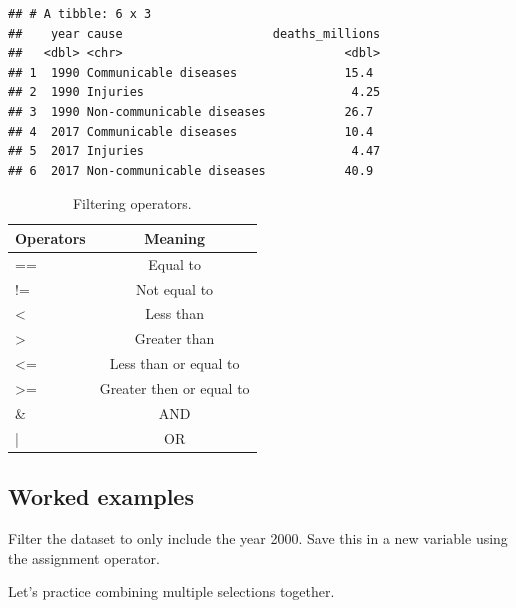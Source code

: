 \documentclass[
  12pt,
  krantz2]{krantz}
\makeatletter
\newenvironment{Shaded}{\begin{snugshade}}{\end{snugshade}}
\newcommand{\DecValTok}[1]{\textcolor[rgb]{0.00,0.00,0.81}{#1}}
\newcommand{\KeywordTok}[1]{\textcolor[rgb]{0.13,0.29,0.53}{\textbf{#1}}}
\newcommand{\NormalTok}[1]{#1}
\newcommand{\OperatorTok}[1]{\textcolor[rgb]{0.81,0.36,0.00}{\textbf{#1}}}
\newcommand{\StringTok}[1]{\textcolor[rgb]{0.31,0.60,0.02}{#1}}
\newenvironment{kframe}{%
\medskip{}
\setlength{\fboxsep}{.8em}
 \def\at@end@of@kframe{}%
 \ifinner\ifhmode%
  \def\at@end@of@kframe{\end{minipage}}%
  \begin{minipage}{\columnwidth}%
 \fi\fi%
 \def\FrameCommand##1{\hskip\@totalleftmargin \hskip-\fboxsep
 \colorbox{shadecolor}{##1}\hskip-\fboxsep
     \hskip-\linewidth \hskip-\@totalleftmargin \hskip\columnwidth}%
 \MakeFramed {\advance\hsize-\width
   \@totalleftmargin\z@ \linewidth\hsize
   \@setminipage}}%
 {\par\unskip\endMakeFramed%
 \at@end@of@kframe}
\renewenvironment{Shaded}{\begin{kframe}}{\end{kframe}}
\makeatother
\begin{document}
\begin{verbatim}
## # A tibble: 6 x 3
##    year cause                     deaths_millions
##   <dbl> <chr>                               <dbl>
## 1  1990 Communicable diseases               15.4 
## 2  1990 Injuries                             4.25
## 3  1990 Non-communicable diseases           26.7 
## 4  2017 Communicable diseases               10.4 
## 5  2017 Injuries                             4.47
## 6  2017 Non-communicable diseases           40.9
\end{verbatim}

\begin{table}

\caption{\label{tab:chap2-tab-filtering-operators}Filtering operators.}
\centering
\fontsize{8}{10}\selectfont
\begin{tabular}[t]{lc}
\toprule
Operators & Meaning\\
\midrule
== & Equal to\\
!= & Not equal to\\
< & Less than\\
> & Greater than\\
<= & Less than or equal to\\
>= & Greater then or equal to\\
\& & AND\\
\addlinespace
| & OR\\
\bottomrule
\end{tabular}
\end{table}

\hypertarget{worked-examples}{%
\subsection{Worked examples}\label{worked-examples}}

Filter the dataset to only include the year 2000.
Save this in a new variable using the assignment operator.

\begin{Shaded}
\end{Shaded}

Let's practice combining multiple selections together.
\end{document}
